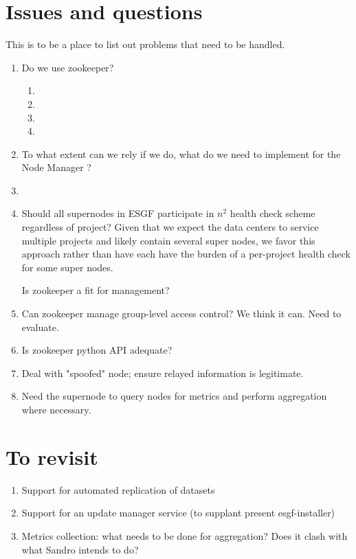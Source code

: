 \documentclass[oneside,12pt]{memoir}
\def\nm{Node Manager{ }}
\begin{document}
\section{Issues and questions}
This is to be a place to list out problems that need to be handled.
\begin{enumerate}
\item
Do we use zookeeper?
\begin{enumerate}
\item {}
\item {}
\item {}
\item {} 
\end{enumerate}
\item
To what extent can we rely if we do,  what do we need to implement for the \nm?
\item
\item
Should all supernodes in ESGF participate in $n^2$ health check scheme regardless of project? Given that we expect the data centers to service multiple projects and likely contain several super nodes, we favor this approach rather than have each have the burden of a per-project health check for some super nodes.

Is zookeeper a fit for management?
\item
Can zookeeper manage group-level access control?  We think it can.  Need to evaluate.
\item
Is zookeeper python API adequate?

\item
Deal with "spoofed" node; ensure relayed information is legitimate. 
\item
Need the supernode to query nodes for metrics and perform aggregation where necessary.


\end{enumerate}
\section{To revisit}
\begin{enumerate}
\item Support for automated replication of datasets
\item Support for an update manager service (to supplant present esgf-installer)
\item Metrics collection: what needs to be done for aggregation? Does it clash with what Sandro intends to do?
\end{enumerate}
\printbibliography
\hypertarget{mymarker}{}
\printindex
\end{document}
